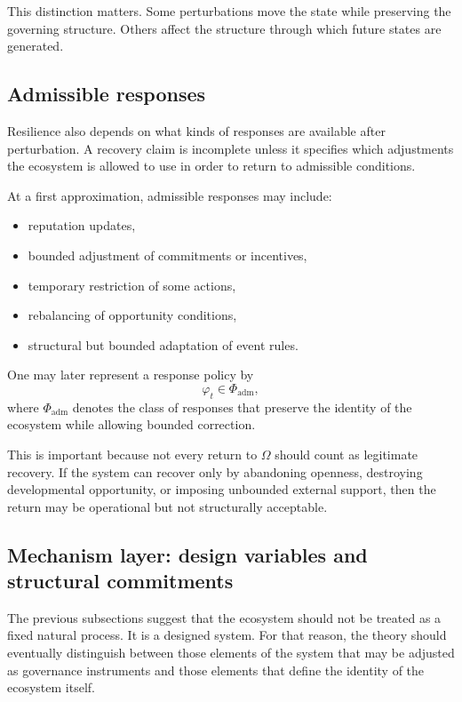 \documentclass[11pt]{article}
\begin{document}
This distinction matters. Some perturbations move the state while preserving the governing structure. Others affect the structure through which future states are generated.

\subsection{Admissible responses}

Resilience also depends on what kinds of responses are available after perturbation. A recovery claim is incomplete unless it specifies which adjustments the ecosystem is allowed to use in order to return to admissible conditions.

At a first approximation, admissible responses may include:
\begin{itemize}
  \item reputation updates,
  \item bounded adjustment of commitments or incentives,
  \item temporary restriction of some actions,
  \item rebalancing of opportunity conditions,
  \item structural but bounded adaptation of event rules.
\end{itemize}

One may later represent a response policy by
\[
\varphi_t \in \Phi_{\mathrm{adm}},
\]
where \(\Phi_{\mathrm{adm}}\) denotes the class of responses that preserve the identity of the ecosystem while allowing bounded correction.

This is important because not every return to \(\Omega\) should count as legitimate recovery. If the system can recover only by abandoning openness, destroying developmental opportunity, or imposing unbounded external support, then the return may be operational but not structurally acceptable.

\subsection{Mechanism layer: design variables and structural commitments}

The previous subsections suggest that the ecosystem should not be treated as a fixed natural process. It is a designed system. For that reason, the theory should eventually distinguish between those elements of the system that may be adjusted as governance instruments and those elements that define the identity of the ecosystem itself.
\end{document}
